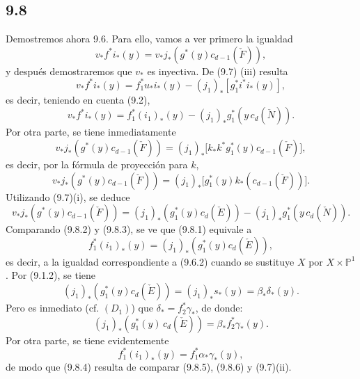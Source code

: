 \subsection*{9.8}

Demostremos ahora 9.6. Para ello, vamos a ver primero la igualdad
\[
v_*f^*i_*(y)=v_*j_*(g^*(y)c_{d-1}(\check F)),
\tag{9.8.1}
\]
y después demostraremos que $v_*$ es inyectiva. De (9.7) (iii) resulta
\[
v_*f^*i_*(y)=f_1^*u_*i_*(y)-(j_1)_*[g_1^*i^*i_*(y)],
\]
es decir, teniendo en cuenta (9.2),
\[
v_*f^*i_*(y)=f_1^*(i_1)_*(y)-(j_1)_*g_1^*(y\,c_d(\check N)).
\tag{9.8.2}
\]
Por otra parte, se tiene inmediatamente
\[
v_*j_*(g^*(y)c_{d-1}(\check F))
=(j_1)_*\bigl[k_*k^*g_1^*(y)c_{d-1}(\check F)\bigr],
\]
es decir, por la fórmula de proyección para $k$,
\[
v_*j_*(g^*(y)c_{d-1}(\check F))
=(j_1)_*\bigl[g_1^*(y)k_*(c_{d-1}(\check F))\bigr].
\]
Utilizando (9.7)(i), se deduce
\[
v_*j_*(g^*(y)c_{d-1}(\check F))
=(j_1)_*(g_1^*(y)c_d(\check E))-(j_1)_*g_1^*(y\,c_d(\check N)).
\tag{9.8.3}
\]
Comparando (9.8.2) y (9.8.3), se ve que (9.8.1) equivale a
\[
f_1^*(i_1)_*(y)=(j_1)_*(g_1^*(y)c_d(\check E)),
\tag{9.8.4}
\]
es decir, a la igualdad correspondiente a (9.6.2) cuando se sustituye $X$ por $X\times\mathbb P^1$. Por (9.1.2), se tiene
\[
(j_1)_*(g_1^*(y)c_d(\check E))=(j_1)_*s_*(y)=\beta_*\delta_*(y).
\]
Pero es inmediato (cf. $(D_1)$) que $\delta_*=f_2^*\gamma_*$, de donde:
\[
(j_1)_*(g_1^*(y)\,c_d(\check E))=\beta_*f_2^*\gamma_*(y).
\tag{9.8.5}
\]
Por otra parte, se tiene evidentemente
\[
f_1^*(i_1)_*(y)=f_1^*\alpha_*\gamma_*(y),
\tag{9.8.6}
\]
de modo que (9.8.4) resulta de comparar (9.8.5), (9.8.6) y (9.7)(ii).
